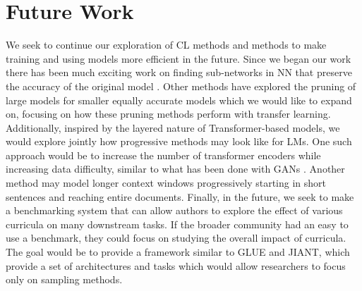 \chapter{Future Work}
\label{chap:future}
We seek to continue our exploration of CL methods and methods to make training and using models more efficient in the future. Since we began our work there has been much exciting work on finding sub-networks in NN that preserve the accuracy of the original model \cite{Frankle2019TheLT}. Other methods have explored the pruning of large models for smaller equally accurate models \cite{Han2016DeepCC} \cite{Yu2017ScalpelCD} \cite{Wynter2020OptimalSE} which we would like to expand on, focusing on how these pruning methods perform with transfer learning. Additionally, inspired by the layered nature of Transformer-based models, we would explore jointly how progressive methods may look like for LMs. One such approach would be to increase the number of transformer encoders while increasing data difficulty, similar to what has been done with GANs \cite{Karras2017ProgressiveGO}. Another method may model longer context windows progressively starting in short sentences and reaching entire documents. Finally, in the future, we seek to make a benchmarking system that can allow authors to explore the effect of various curricula on many downstream tasks. If the broader community had an easy to use a benchmark, they could focus on studying the overall impact of curricula.  The goal would be to provide a framework similar to GLUE and JIANT, which provide a set of architectures and tasks which would allow researchers to focus only on sampling methods.